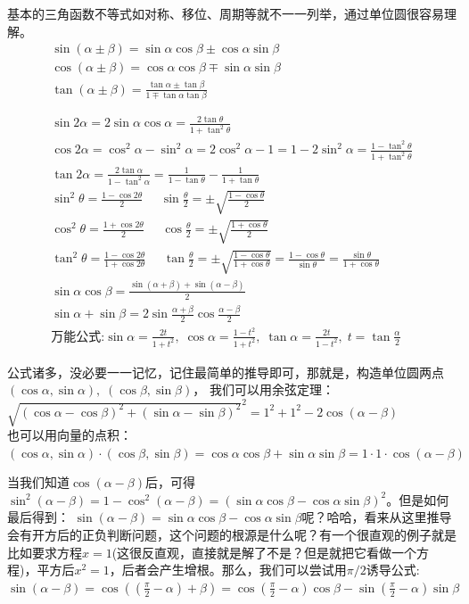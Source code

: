 \documentclass[../main.tex]{subfiles}
\begin{document}
基本的三角函数不等式如对称、移位、周期等就不一一列举，通过单位圆很容易理解。
\begin{gather*}
  \sin(\alpha \pm \beta) = \sin\alpha\cos\beta \pm \cos\alpha\sin\beta\\
  \cos(\alpha \pm \beta) = \cos\alpha\cos\beta \mp \sin\alpha\sin\beta\\
  \tan(\alpha \pm \beta) = \frac{\tan\alpha \pm \tan\beta}{1 \mp \tan\alpha\tan\beta}\\
  \phantom{xxx}\\
  \sin2\alpha = 2\sin\alpha\cos\alpha=\frac{2\tan \theta}{1+\tan^2\theta}\\
  \cos2\alpha = \cos^2\alpha - \sin^2\alpha=2\cos^2\alpha-1=1-2\sin^2\alpha=\frac{1-\tan^2\theta}{1+\tan^2\theta}\\
  \tan2\alpha = \frac{2\tan\alpha}{1-\tan^2\alpha}=\frac{1}{1-\tan\theta} - \frac{1}{1+\tan\theta}\\
  \sin^2\theta = \frac{1-\cos2\theta}{2} \;\;\;\;\; \sin \frac{\theta}{2}=\pm \sqrt{\frac{1-\cos \theta}{2}}  \\
  \cos^2\theta = \frac{1+\cos2\theta}{2} \;\;\;\;\; \cos \frac{\theta}{2}=\pm \sqrt{\frac{1+\cos \theta}{2}} \\
  \tan^2\theta = \frac{1-\cos2\theta}{1+\cos2\theta} \;\;\;\;\; \tan \frac{\theta}{2}=\pm \sqrt{\frac{1-\cos\theta}{1+\cos\theta}}=\frac{1-\cos \theta}{\sin \theta}=\frac{\sin \theta}{1+\cos \theta} \\
  \sin\alpha\cos\beta = \frac{\sin(\alpha+\beta)+\sin(\alpha-\beta)}{2}\\
  \sin\alpha + \sin\beta = 2\sin \frac{\alpha+\beta}{2}\cos \frac{\alpha-\beta}{2}\\
  \textbf{万能公式:}\sin\alpha=\frac{2t}{1+t^{2}}, \; \cos\alpha=\frac{1-t^2}{1+t^2}, \; \tan\alpha=\frac{2t}{1-t^2}, \; t=\tan \frac{\alpha}{2}
\end{gather*}

公式诸多，没必要一一记忆，记住最简单的推导即可，那就是\bm{$\cos(\alpha-\beta)$}，构造单位圆两点$(\cos\alpha, \sin\alpha),\;(\cos\beta, \sin\beta)$，
我们可以用余弦定理：\\
$\sqrt{(\cos\alpha-\cos\beta)^2+(\sin\alpha-\sin\beta)^2}^2=1^2+1^2-2\cos(\alpha-\beta)$\\
也可以用向量的点积：\\
$(\cos\alpha, \sin\alpha)\cdot (\cos\beta, \sin\beta)=\cos\alpha\cos\beta+\sin\alpha\sin\beta=1\cdot 1 \cdot \cos(\alpha-\beta)$

当我们知道$\cos(\alpha-\beta)$后，可得$\sin^2(\alpha-\beta)=1-\cos^2(\alpha-\beta)=(\sin\alpha\cos\beta-\cos\alpha\sin\beta)^2$。但是如何最后得到：
$\sin(\alpha-\beta)=\sin\alpha\cos\beta-\cos\alpha\sin\beta$呢？哈哈，看来从这里推导会有开方后的正负判断问题，这个问题的根源是什么呢？有一个很直观的例子就是比如要求方程$x=1$(这很反直观，直接就是解了不是？但是就把它看做一个方程)，平方后$x^2=1$，后者会产生增根。那么，我们可以尝试用$\pi/2$诱导公式:\\
$\sin(\alpha-\beta)=\cos((\frac{\pi}{2}-\alpha)+\beta)=\cos(\frac{\pi}{2}-\alpha)\cos\beta-\sin(\frac{\pi}{2}-\alpha)\sin\beta$
\end{document}
